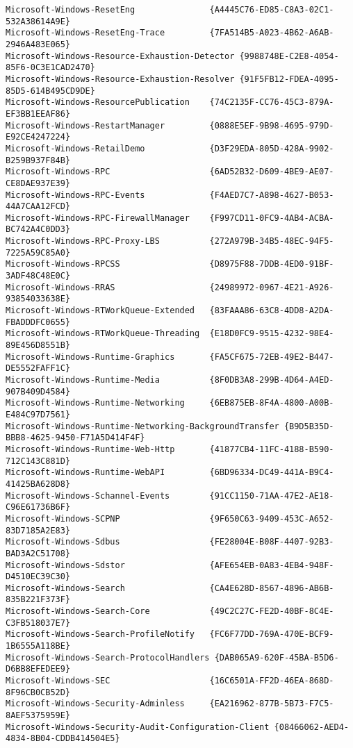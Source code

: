 \documentclass{report}
\begin{document}
\begin{lstlisting}[breaklines=true,basicstyle=\tiny]
Microsoft-Windows-ResetEng               {A4445C76-ED85-C8A3-02C1-532A38614A9E}
Microsoft-Windows-ResetEng-Trace         {7FA514B5-A023-4B62-A6AB-2946A483E065}
Microsoft-Windows-Resource-Exhaustion-Detector {9988748E-C2E8-4054-85F6-0C3E1CAD2470}
Microsoft-Windows-Resource-Exhaustion-Resolver {91F5FB12-FDEA-4095-85D5-614B495CD9DE}
Microsoft-Windows-ResourcePublication    {74C2135F-CC76-45C3-879A-EF3BB1EEAF86}
Microsoft-Windows-RestartManager         {0888E5EF-9B98-4695-979D-E92CE4247224}
Microsoft-Windows-RetailDemo             {D3F29EDA-805D-428A-9902-B259B937F84B}
Microsoft-Windows-RPC                    {6AD52B32-D609-4BE9-AE07-CE8DAE937E39}
Microsoft-Windows-RPC-Events             {F4AED7C7-A898-4627-B053-44A7CAA12FCD}
Microsoft-Windows-RPC-FirewallManager    {F997CD11-0FC9-4AB4-ACBA-BC742A4C0DD3}
Microsoft-Windows-RPC-Proxy-LBS          {272A979B-34B5-48EC-94F5-7225A59C85A0}
Microsoft-Windows-RPCSS                  {D8975F88-7DDB-4ED0-91BF-3ADF48C48E0C}
Microsoft-Windows-RRAS                   {24989972-0967-4E21-A926-93854033638E}
Microsoft-Windows-RTWorkQueue-Extended   {83FAAA86-63C8-4DD8-A2DA-FBADDDFC0655}
Microsoft-Windows-RTWorkQueue-Threading  {E18D0FC9-9515-4232-98E4-89E456D8551B}
Microsoft-Windows-Runtime-Graphics       {FA5CF675-72EB-49E2-B447-DE5552FAFF1C}
Microsoft-Windows-Runtime-Media          {8F0DB3A8-299B-4D64-A4ED-907B409D4584}
Microsoft-Windows-Runtime-Networking     {6EB875EB-8F4A-4800-A00B-E484C97D7561}
Microsoft-Windows-Runtime-Networking-BackgroundTransfer {B9D5B35D-BBB8-4625-9450-F71A5D414F4F}
Microsoft-Windows-Runtime-Web-Http       {41877CB4-11FC-4188-B590-712C143C881D}
Microsoft-Windows-Runtime-WebAPI         {6BD96334-DC49-441A-B9C4-41425BA628D8}
Microsoft-Windows-Schannel-Events        {91CC1150-71AA-47E2-AE18-C96E61736B6F}
Microsoft-Windows-SCPNP                  {9F650C63-9409-453C-A652-83D7185A2E83}
Microsoft-Windows-Sdbus                  {FE28004E-B08F-4407-92B3-BAD3A2C51708}
Microsoft-Windows-Sdstor                 {AFE654EB-0A83-4EB4-948F-D4510EC39C30}
Microsoft-Windows-Search                 {CA4E628D-8567-4896-AB6B-835B221F373F}
Microsoft-Windows-Search-Core            {49C2C27C-FE2D-40BF-8C4E-C3FB518037E7}
Microsoft-Windows-Search-ProfileNotify   {FC6F77DD-769A-470E-BCF9-1B6555A118BE}
Microsoft-Windows-Search-ProtocolHandlers {DAB065A9-620F-45BA-B5D6-D6BB8EFEDEE9}
Microsoft-Windows-SEC                    {16C6501A-FF2D-46EA-868D-8F96CB0CB52D}
Microsoft-Windows-Security-Adminless     {EA216962-877B-5B73-F7C5-8AEF5375959E}
Microsoft-Windows-Security-Audit-Configuration-Client {08466062-AED4-4834-8B04-CDDB414504E5}

\end{lstlisting}
\end{document}
